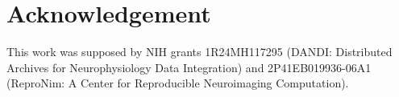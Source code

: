 \section*{Acknowledgement}

This work was supposed by NIH grants 1R24MH117295 (DANDI: Distributed Archives for Neurophysiology Data Integration) and 2P41EB019936-06A1 (ReproNim: A Center for Reproducible Neuroimaging Computation).
